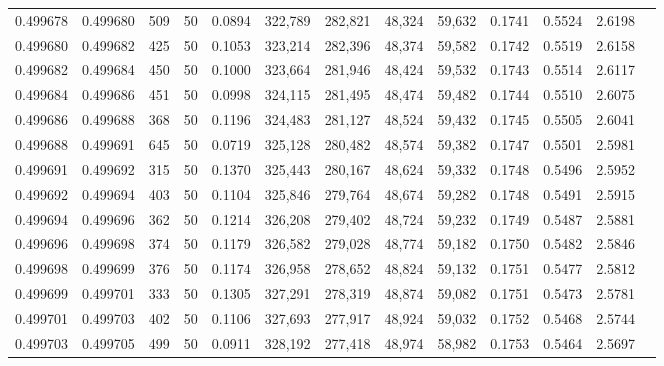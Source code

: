 \begin{tabular}{rrrrrrrrrrrrr}
0.499678 & 0.499680 & 509 &  50 &                                     0.0894 & 322,789 & 282,821 &  48,324 &  59,632 & 0.1741 & 0.5524 & 2.6198 \\
0.499680 & 0.499682 & 425 &  50 &                                     0.1053 & 323,214 & 282,396 &  48,374 &  59,582 & 0.1742 & 0.5519 & 2.6158 \\
0.499682 & 0.499684 & 450 &  50 &                                     0.1000 & 323,664 & 281,946 &  48,424 &  59,532 & 0.1743 & 0.5514 & 2.6117 \\
0.499684 & 0.499686 & 451 &  50 &                                     0.0998 & 324,115 & 281,495 &  48,474 &  59,482 & 0.1744 & 0.5510 & 2.6075 \\
0.499686 & 0.499688 & 368 &  50 &                                     0.1196 & 324,483 & 281,127 &  48,524 &  59,432 & 0.1745 & 0.5505 & 2.6041 \\
0.499688 & 0.499691 & 645 &  50 &                                     0.0719 & 325,128 & 280,482 &  48,574 &  59,382 & 0.1747 & 0.5501 & 2.5981 \\
0.499691 & 0.499692 & 315 &  50 &                                     0.1370 & 325,443 & 280,167 &  48,624 &  59,332 & 0.1748 & 0.5496 & 2.5952 \\
0.499692 & 0.499694 & 403 &  50 &                                     0.1104 & 325,846 & 279,764 &  48,674 &  59,282 & 0.1748 & 0.5491 & 2.5915 \\
0.499694 & 0.499696 & 362 &  50 &                                     0.1214 & 326,208 & 279,402 &  48,724 &  59,232 & 0.1749 & 0.5487 & 2.5881 \\
0.499696 & 0.499698 & 374 &  50 &                                     0.1179 & 326,582 & 279,028 &  48,774 &  59,182 & 0.1750 & 0.5482 & 2.5846 \\
0.499698 & 0.499699 & 376 &  50 &                                     0.1174 & 326,958 & 278,652 &  48,824 &  59,132 & 0.1751 & 0.5477 & 2.5812 \\
0.499699 & 0.499701 & 333 &  50 &                                     0.1305 & 327,291 & 278,319 &  48,874 &  59,082 & 0.1751 & 0.5473 & 2.5781 \\
0.499701 & 0.499703 & 402 &  50 &                                     0.1106 & 327,693 & 277,917 &  48,924 &  59,032 & 0.1752 & 0.5468 & 2.5744 \\
0.499703 & 0.499705 & 499 &  50 &                                     0.0911 & 328,192 & 277,418 &  48,974 &  58,982 & 0.1753 & 0.5464 & 2.5697 \\

\end{tabular}

